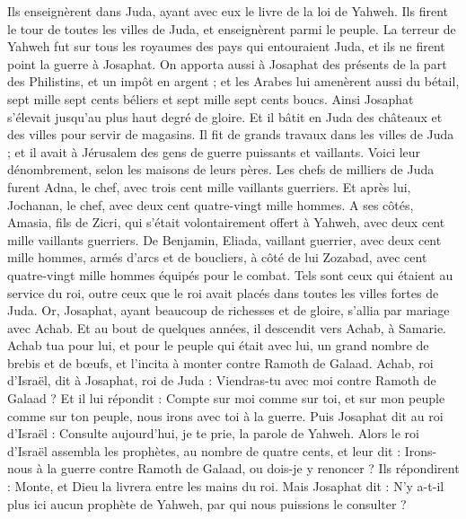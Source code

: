 \begin{multicols}{2}
Ils enseignèrent dans Juda, ayant avec eux le livre de la loi de Yahweh. Ils firent le tour de toutes les villes de Juda, et enseignèrent parmi le peuple.
La terreur de Yahweh fut sur tous les royaumes des pays qui entouraient Juda, et ils ne firent point la guerre à Josaphat.
On apporta aussi à Josaphat des présents de la part des Philistins, et un impôt en argent ; et les Arabes lui amenèrent aussi du bétail, sept mille sept cents béliers et sept mille sept cents boucs.
Ainsi Josaphat s'élevait jusqu'au plus haut degré de gloire. Et il bâtit en Juda des châteaux et des villes pour servir de magasins.
Il fit de grands travaux dans les villes de Juda ; et il avait à Jérusalem des gens de guerre puissants et vaillants.
Voici leur dénombrement, selon les maisons de leurs pères. Les chefs de milliers de Juda furent Adna, le chef, avec trois cent mille vaillants guerriers.
Et après lui, Jochanan, le chef, avec deux cent quatre-vingt mille hommes.
A ses côtés, Amasia, fils de Zicri, qui s'était volontairement offert à Yahweh, avec deux cent mille vaillants guerriers.
De Benjamin, Eliada, vaillant guerrier, avec deux cent mille hommes, armés d'arcs et de boucliers,
à côté de lui Zozabad, avec cent quatre-vingt mille hommes équipés pour le combat.
Tels sont ceux qui étaient au service du roi, outre ceux que le roi avait placés dans toutes les villes fortes de Juda.
\VerseOne{}Or, Josaphat, ayant beaucoup de richesses et de gloire, s'allia par mariage avec Achab.
Et au bout de quelques années, il descendit vers Achab, à Samarie. Achab tua pour lui, et pour le peuple qui était avec lui, un grand nombre de brebis et de bœufs, et l'incita à monter contre Ramoth de Galaad.
Achab, roi d'Israël, dit à Josaphat, roi de Juda : Viendras-tu avec moi contre Ramoth de Galaad ? Et il lui répondit : Compte sur moi comme sur toi, et sur mon peuple comme sur ton peuple, nous irons avec toi à la guerre.
Puis Josaphat dit au roi d'Israël : Consulte aujourd'hui, je te prie, la parole de Yahweh.
Alors le roi d'Israël assembla les prophètes, au nombre de quatre cents, et leur dit : Irons-nous à la guerre contre Ramoth de Galaad, ou dois-je y renoncer ? Ils répondirent : Monte, et Dieu la livrera entre les mains du roi.
Mais Josaphat dit : N'y a-t-il plus ici aucun prophète de Yahweh, par qui nous puissions le consulter ?

\end{multicols}
